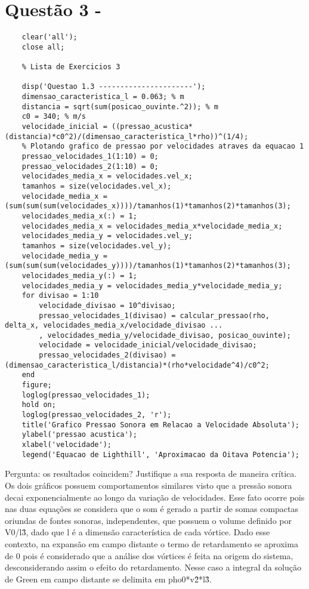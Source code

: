 	\section{Questão 3 - }

	\begin{lstlisting}
	clear('all');
	close all;

	% Lista de Exercicios 3

	disp('Questao 1.3 ----------------------');
	dimensao_caracteristica_l = 0.063; % m
	distancia = sqrt(sum(posicao_ouvinte.^2)); % m 
	c0 = 340; % m/s 
	velocidade_inicial = ((pressao_acustica*(distancia)*c0^2)/(dimensao_caracteristica_l*rho))^(1/4);
	% Plotando grafico de pressao por velocidades atraves da equacao 1
	pressao_velocidades_1(1:10) = 0;
	pressao_velocidades_2(1:10) = 0;
	velocidades_media_x = velocidades.vel_x;
	tamanhos = size(velocidades.vel_x);
	velocidade_media_x = (sum(sum(sum(velocidades_x))))/tamanhos(1)*tamanhos(2)*tamanhos(3);
	velocidades_media_x(:) = 1;
	velocidades_media_x = velocidades_media_x*velocidade_media_x;
	velocidades_media_y = velocidades.vel_y;
	tamanhos = size(velocidades.vel_y);
	velocidade_media_y = (sum(sum(sum(velocidades_y))))/tamanhos(1)*tamanhos(2)*tamanhos(3);
	velocidades_media_y(:) = 1;
	velocidades_media_y = velocidades_media_y*velocidade_media_y;
	for divisao = 1:10
		velocidade_divisao = 10^divisao;
		pressao_velocidades_1(divisao) = calcular_pressao(rho, delta_x, velocidades_media_x/velocidade_divisao ...
		, velocidades_media_y/velocidade_divisao, posicao_ouvinte);
		velocidade = velocidade_inicial/velocidade_divisao;
		pressao_velocidades_2(divisao) = (dimensao_caracteristica_l/distancia)*(rho*velocidade^4)/c0^2;
	end
	figure;
	loglog(pressao_velocidades_1);
	hold on;
	loglog(pressao_velocidades_2, 'r');
	title('Grafico Pressao Sonora em Relacao a Velocidade Absoluta');
	ylabel('pressao acustica');
	xlabel('velocidade');
	legend('Equacao de Lighthill', 'Aproximacao da Oitava Potencia');
	\end{lstlisting}

 Pergunta: os resultados coincidem? Justifique a sua resposta de maneira crítica.
 Os dois gráficos possuem comportamentos similares visto que a pressão sonora decai exponencialmente ao longo
 da variação de velocidades. Esse fato ocorre pois nas duas equações se considera que o som é gerado a partir 
 de somas compactas oriundas de fontes sonoras, independentes,
 que possuem o volume definido por V0/l\^3, dado que l é a dimensão característica de cada vórtice.
 Dado esse contexto, na expansão em campo distante o termo de retardamento se aproxima de 0 pois é considerado
 que a análise dos vórtices é feita na origem do sistema, desconsiderando assim o efeito do retardamento. Nesse caso
 a integral da solução de Green em campo distante se delimita em pho0*v\^2*l\^3.